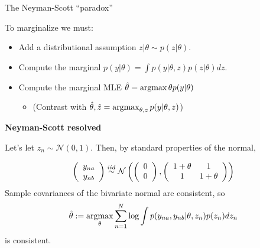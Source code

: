 \begin{frame}{The Neyman-Scott ``paradox''}

To marginalize we must:

\begin{itemize}
\item Add a distributional assumption $z | \theta \sim p(z \vert \theta)$.
\item Compute the marginal $p(y | \theta) = \int p(y | \theta, z) p(z \vert \theta) d z$.
\item Compute the marginal MLE $\hat\theta = \operatorname*{\mathrm{argmax}}{\theta} p(y | \theta)$
\begin{itemize}
    \item (Contrast with $\hat\theta, \hat{z} = \operatorname*{\mathrm{argmax}}_{\theta, z} p(y | \theta, z)$)
\end{itemize}
\end{itemize}


\textbf{Neyman-Scott resolved}

Let's let $z_n \sim \mathcal{N}(0, 1)$.  Then, by standard properties of the
normal,

%
\begin{align*}
%
\left(
\begin{array}{c}
    y_{na} \\
    y_{nb}
\end{array}
\right)
\iid
\mathcal{N}\left(
\left(
\begin{array}{c}
    0 \\
    0
\end{array}
\right),
%
\left(
\begin{array}{cc}
    1 + \theta& 1 \\
    1& 1 + \theta \\
\end{array}
\right)
%
\right)
%
\end{align*}
%
Sample covariances of the bivariate normal are consistent, so
%
\begin{align*}
%
\thetahat := \argmax_\theta \sumn \log \int p(y_{na}, y_{nb} | \theta, z_n) p(z_n) dz_n
%
\end{align*}
%
is consistent.





\end{frame}
